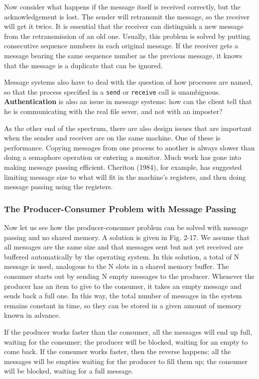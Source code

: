 \documentclass{book}
\newcommand {\kw}  [1] {\textbf{#1}}
\newcommand {\cmd} [1] {\texttt{#1}}
\begin{document}
Now consider what happens if the message itself is received correctly, but the acknowledgement is lost.
The sender will retransmit the message, so the receiver will get it twice.
It is essential that the receiver can distinguish a new message from the retransmission of an old one.
Usually, this problem is solved by putting consecutive sequence numbers in each original message.
If the receiver gets a message bearing the same sequence number as the previous message,
it knows that the message is a duplicate that can be ignored.

Message systems also have to deal with the question of how processes are named,
so that the process specified in a \cmd{send} or \cmd{receive} call is unambiguous.
\kw{Authentication} is also an issue in message systems:
how can the client tell that he is communicating with the real file sever, and not with an imposter?

As the other end of the spectrum, there are also design issues that are important when the sender and receiver are on the same machine.
One of these is performance.
Copying messages from one process to another is always slower than doing a semaphore operation or entering a monitor.
Much work has gone into making message passing efficient.
Cheriton (1984), for example, has suggested limiting message size to what will fit in the machine's registers,
and then doing message passing using the registers.

\subsubsection*{The Producer-Consumer Problem with Message Passing}
Now let us see how the producer-consumer problem can be solved with message passing and no shared memory.
A solution is given in Fig. 2-17.
We assume that all messages are the same size and that messages sent but not yet received are buffered automatically by the operating system.
In this solution, a total of N message is used, analogous to the N slots in a shared memory buffer.
The consumer starts out by sending N empty messages to the producer.
Whenever the producer has an item to give to the consumer, it takes an empty message and sends back a full one.
In this way, the total number of messages in the system remains constant in time, 
so they can be stored in a given amount of memory known in advance.

If the producer works faster than the consumer, all the messages will end up full, waiting for the consumer;
the producer will be blocked, waiting for an empty to come back.
If the consumer works faster, then the reverse happens;
all the messages will be empties waiting for the producer to fill them up; the consumer will be blocked, waiting for a full message.
\end{document}
